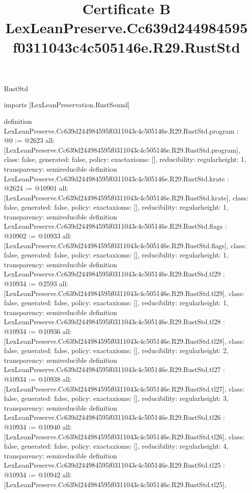 \begin{lexlean}{RustStd}
\title{Certificate B LexLeanPreserve.Cc639d244984595f0311043c4c505146e.R29.RustStd}
\begin{coremodule}
imports [LexLeanPreservation.RustSound]

definition LexLeanPreserve.Cc639d244984595f0311043c4c505146e.R29.RustStd.program : @0 := @2623 {
  all: [LexLeanPreserve.Cc639d244984595f0311043c4c505146e.R29.RustStd.program],
  class: false,
  generated: false,
  policy: exact{axioms: []},
  reducibility: regular{height: 1},
  transparency: semireducible
}
definition LexLeanPreserve.Cc639d244984595f0311043c4c505146e.R29.RustStd.krate : @2624 := @10901 {
  all: [LexLeanPreserve.Cc639d244984595f0311043c4c505146e.R29.RustStd.krate],
  class: false,
  generated: false,
  policy: exact{axioms: []},
  reducibility: regular{height: 1},
  transparency: semireducible
}
definition LexLeanPreserve.Cc639d244984595f0311043c4c505146e.R29.RustStd.flags : @10902 := @10933 {
  all: [LexLeanPreserve.Cc639d244984595f0311043c4c505146e.R29.RustStd.flags],
  class: false,
  generated: false,
  policy: exact{axioms: []},
  reducibility: regular{height: 1},
  transparency: semireducible
}
definition LexLeanPreserve.Cc639d244984595f0311043c4c505146e.R29.RustStd.tl29 : @10934 := @2593 {
  all: [LexLeanPreserve.Cc639d244984595f0311043c4c505146e.R29.RustStd.tl29],
  class: false,
  generated: false,
  policy: exact{axioms: []},
  reducibility: regular{height: 1},
  transparency: semireducible
}
definition LexLeanPreserve.Cc639d244984595f0311043c4c505146e.R29.RustStd.tl28 : @10934 := @10936 {
  all: [LexLeanPreserve.Cc639d244984595f0311043c4c505146e.R29.RustStd.tl28],
  class: false,
  generated: false,
  policy: exact{axioms: []},
  reducibility: regular{height: 2},
  transparency: semireducible
}
definition LexLeanPreserve.Cc639d244984595f0311043c4c505146e.R29.RustStd.tl27 : @10934 := @10938 {
  all: [LexLeanPreserve.Cc639d244984595f0311043c4c505146e.R29.RustStd.tl27],
  class: false,
  generated: false,
  policy: exact{axioms: []},
  reducibility: regular{height: 3},
  transparency: semireducible
}
definition LexLeanPreserve.Cc639d244984595f0311043c4c505146e.R29.RustStd.tl26 : @10934 := @10940 {
  all: [LexLeanPreserve.Cc639d244984595f0311043c4c505146e.R29.RustStd.tl26],
  class: false,
  generated: false,
  policy: exact{axioms: []},
  reducibility: regular{height: 4},
  transparency: semireducible
}
definition LexLeanPreserve.Cc639d244984595f0311043c4c505146e.R29.RustStd.tl25 : @10934 := @10942 {
  all: [LexLeanPreserve.Cc639d244984595f0311043c4c505146e.R29.RustStd.tl25],
}
\end{coremodule}
\end{lexlean}

